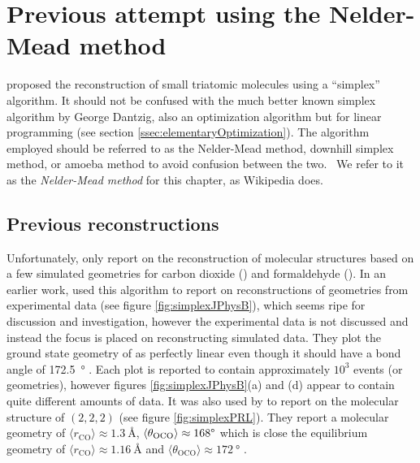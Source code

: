 \section{Previous attempt using the Nelder-Mead method} \label{sec:nelderMead}
\citet{Brichta09} proposed the reconstruction of small triatomic molecules using a ``simplex'' algorithm. It should not be confused with the much better known simplex algorithm by George Dantzig, also an optimization algorithm but for linear programming (see section \ref{ssec:elementaryOptimization}). The algorithm employed should be referred to as the Nelder-Mead method, downhill simplex method, or amoeba method to avoid confusion between the two.\footnotemark~ We refer to it as the \emph{Nelder-Mead method} for this chapter, as Wikipedia does.


\subsection{Previous reconstructions}
Unfortunately, \citet{Brichta09} only report on the reconstruction of molecular structures based on a few simulated geometries for carbon dioxide () and formaldehyde (). In an earlier work, \citet{Brichta07} used this algorithm to report on reconstructions of  geometries from experimental data (see figure \ref{fig:simplexJPhysB}), which seems ripe for discussion and investigation, however the experimental data is not discussed and instead the focus is placed on reconstructing simulated data. They plot the ground state geometry of  as perfectly linear even though it should have a bond angle of \SI{172.5}{\degree} \citep{Siegmann02, Mathur92}. Each plot is reported to contain approximately $10^3$ events (or geometries), however figures \ref{fig:simplexJPhysB}(a) and (d) appear to contain quite different amounts of data. It was also used by \citet{Bocharova11} to report on the molecular structure of  $(2,2,2)$ (see figure \ref{fig:simplexPRL}). They report a molecular geometry of $\langle r_\mathrm{CO} \rangle \approx \SI{1.3}{\angstrom}$, $\langle \theta_\mathrm{OCO} \rangle \approx 168\degree$ which is close the equilibrium geometry of $\langle r_\mathrm{CO} \rangle \approx \SI{1.16}{\angstrom}$ \citep{ChemistryOfTheElements} and $\langle \theta_\mathrm{OCO} \rangle \approx \SI{172}{\degree}$ \citep{Siegmann02, Mathur92}.

